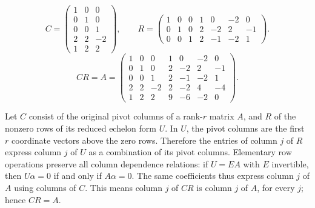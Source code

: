 \[ C=\begin{pmatrix}1&0&0\\0&1&0\\0&0&1\\2&2&-2\\1&2&2\end{pmatrix},\qquad R=\begin{pmatrix}1&0&0&1&0&-2&0\\0&1&0&2&-2&2&-1\\0&0&1&2&-1&-2&1\end{pmatrix}.\]
\[ CR=A=\begin{pmatrix}1&0&0&1&0&-2&0\\0&1&0&2&-2&2&-1\\0&0&1&2&-1&-2&1\\2&2&-2&2&-2&4&-4\\1&2&2&9&-6&-2&0\end{pmatrix}.\]

Let $C$ consist of the original pivot columns of a rank-$r$ matrix $A$,
and $R$ of the nonzero rows of its reduced echelon form $U$.
In $U$, the pivot columns are the first $r$ coordinate vectors above the
zero rows. Therefore the entries of column $j$ of $R$ express column $j$
of $U$ as a combination of its pivot columns. Elementary row operations
preserve all column dependence relations: if $U=EA$ with $E$ invertible,
then $U\alpha=0$ if and only if $A\alpha=0$. The same coefficients thus
express column $j$ of $A$ using columns of $C$. This means column $j$ of
$CR$ is column $j$ of $A$, for every $j$; hence $CR=A$.

